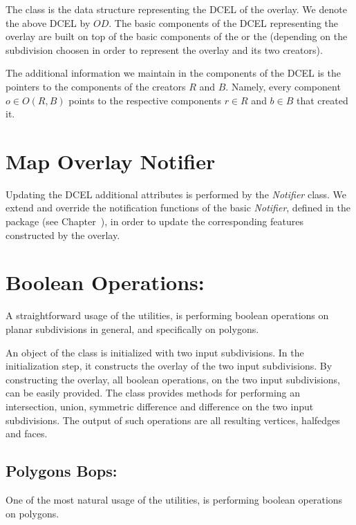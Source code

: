 \begin{ccTexOnly}
The 
class is the data structure representing the DCEL of the overlay. 
We denote the above DCEL by $OD$.
The basic components of the DCEL representing the overlay are built 
on top of the basic components of the  or 
the  
(depending on the subdivision choosen in 
order to represent the overlay and its two creators).

The additional information we maintain in the components of the DCEL 
is the pointers to the components of the creators $R$ and $B$.
Namely, every component $o \in O(R,B)$ points to the 
respective components $r \in R$ and $b \in B$ that created it. 


\section{Map Overlay Notifier}
\label{sec:notifier}
Updating the DCEL additional attributes is performed by the {\em Notifier} class.
We extend and override the notification functions of the basic {\em Notifier}, 
defined in the  package 
(see Chapter~), 
in order to update the corresponding features constructed by the overlay. 

\section{Boolean Operations:}
A straightforward usage of the  
utilities, is performing boolean operations on planar subdivisions in general, 
and specifically on polygons.

An object of the  class is initialized with 
two input subdivisions. In the initialization step, it constructs the overlay 
of the two input subdivisions. By constructing the overlay, all boolean operations, 
on the two input subdivisions, can be easily provided.
The   class provides methods for 
performing an intersection, union, symmetric difference and difference on the two 
input subdivisions. 
The output of such operations are all resulting vertices, halfedges and faces.


\subsection*{Polygons Bops:}
One of the most natural usage of 
the  utilities, 
is performing boolean operations on polygons.


\end{ccTexOnly}
